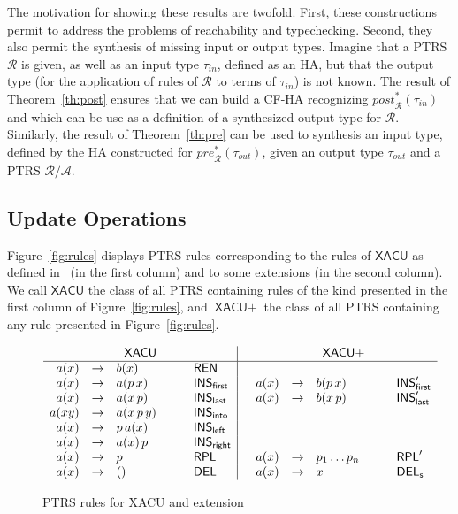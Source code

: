 \documentclass[a4paper]{article}
\newcommand{\remarque}[1]{}
\theoremstyle{plain}
\newcommand{\R}{\mathcal{R}}
\newcommand{\A}{\mathcal{A}}
\newcommand{\ptrs}[2]{{#1}{/}{#2}}
\newcommand{\pre}{\mathit{pre}}
\newcommand{\post}{\mathit{post}}
\newcommand{\XACU}{\textsf{XACU}}
\newcommand{\INS}{\mathsf{INS}}
\newcommand{\REN}{\mathsf{REN}}
\newcommand{\RPL}{\mathsf{RPL}}
\newcommand{\DEL}{\mathsf{DEL}}
\begin{document}
\remarque{** INTRO, DEL?}
The motivation for showing these results are twofold.
First, these constructions permit to address the problems of reachability and 
typechecking. \remarque{TODO.}
Second, they also permit the synthesis of missing input or output types.
Imagine that a PTRS $\R$ is given, as well
as an input type $\tau_{\mathit{in}}$, defined as an HA, but that the output type 
(for the application of rules of $\R$ to terms of $\tau_{\mathit{in}}$)
is not known.
The result of Theorem~\ref{th:post} ensures that we can build a CF-HA
recognizing $\post^*_{\R}(\tau_{\mathit{in}})$ 
and which can be use as a definition of a synthesized output type for $\R$.
Similarly, the result of Theorem~\ref{th:pre} can be used
to synthesis an input type, defined by the HA constructed for 
$\pre^*_{\R}(\tau_{\mathit{out}})$,
given an output type $\tau_{\mathit{out}}$ and a PTRS $\ptrs{\R}{\A}$.
\remarque{**}


\subsection{Update Operations} \label{sec:XACU}
Figure~\ref{fig:rules} displays PTRS rules corresponding 
to the rules of $\XACU$ as defined in~\cite{FundulakiManeth07} (in the first column)
and to some extensions (in the second column).
We call $\XACU$ the class of all PTRS containing rules of the kind presented in 
the first column of Figure~\ref{fig:rules},
and $\XACU+$ the class of all PTRS containing any rule 
presented in Figure~\ref{fig:rules}.


\begin{figure}
\[
\begin{array}{rclcl|crclcl}
\multicolumn{5}{c|}{\XACU} & & \multicolumn{5}{c}{\XACU+}\\
\hline
a(x) & \to & b(x)        & & \REN\\
a(x) & \to & a(p\, x)    & & \INS_\mathsf{first} & &
a(x) & \to & b(p\, x)    & & \INS'_\mathsf{first}\\
a(x) & \to & a(x\, p)    & & \INS_\mathsf{last} & &
a(x) & \to & b(x\, p)    & & \INS'_\mathsf{last}\\
a(xy) & \to & a(x\, p\, y) & & \INS_\mathsf{into} & &
\\
a(x) & \to & p\, a(x)    & & \INS_\mathsf{left}\\
a(x) & \to & a(x)\, p    & & \INS_\mathsf{right}\\
a(x) & \to & p  & \quad & \RPL & &
a(x) & \to & p_1 \ldots p_n & \quad & \RPL'\\
a(x) & \to & ()     & & \DEL & &
a(x) & \to & x         & & \DEL_{\mathsf{s}}\\
\end{array}
\]
\caption{PTRS rules for XACU and extension}
\label{fig:rules} \label{fig:XACU}
\end{figure}
\end{document}
